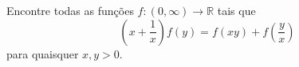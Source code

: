 Encontre todas as funções $f: (0, \infty) \to \mathbb{R}$ tais que
\[\left( x + \frac{1}{x} \right) f(y) = f(xy) + f\left(\frac{y}{x}\right)\] para quaisquer $x, y > 0$.
